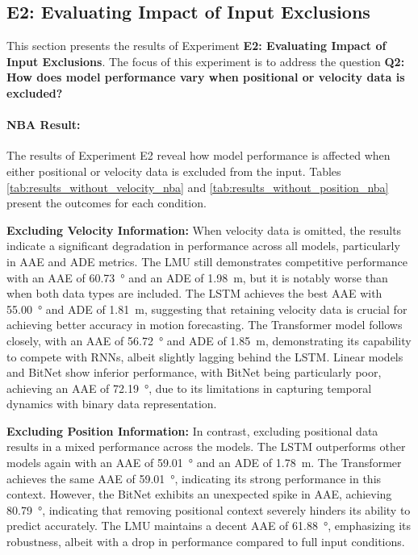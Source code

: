 \subsection{E2: Evaluating Impact of Input Exclusions}
\label{exp:pos_vel}
This section presents the results of Experiment \textbf{E2: Evaluating Impact of Input Exclusions}. The focus of this experiment is to address the question \textbf{Q2: How does model performance vary when positional or velocity data is excluded?}
\paragraph {NBA Result:}
The results of Experiment E2 reveal how model performance is affected when either positional or velocity data is excluded from the input. Tables \ref{tab:results_without_velocity_nba} and \ref{tab:results_without_position_nba} present the outcomes for each condition.

\textbf{Excluding Velocity Information:} When velocity data is omitted, the results indicate a significant degradation in performance across all models, particularly in AAE and ADE metrics. The LMU still demonstrates competitive performance with an AAE of \SI{60.73}{\degree} and an ADE of \SI{1.98}{\meter}, but it is notably worse than when both data types are included. The LSTM achieves the best AAE with \SI{55.00}{\degree} and ADE of \SI{1.81}{\meter}, suggesting that retaining velocity data is crucial for achieving better accuracy in motion forecasting. The Transformer model follows closely, with an AAE of \SI{56.72}{\degree} and ADE of \SI{1.85}{\meter}, demonstrating its capability to compete with RNNs, albeit slightly lagging behind the LSTM. Linear models and BitNet show inferior performance, with BitNet being particularly poor, achieving an AAE of \SI{72.19}{\degree}, due to its limitations in capturing temporal dynamics with binary data representation.

\textbf{Excluding Position Information:} In contrast, excluding positional data results in a mixed performance across the models. The LSTM outperforms other models again with an AAE of \SI{59.01}{\degree} and an ADE of \SI{1.78}{\meter}. The Transformer achieves the same AAE of \SI{59.01}{\degree}, indicating its strong performance in this context. However, the BitNet exhibits an unexpected spike in AAE, achieving \SI{80.79}{\degree}, indicating that removing positional context severely hinders its ability to predict accurately. The LMU maintains a decent AAE of \SI{61.88}{\degree}, emphasizing its robustness, albeit with a drop in performance compared to full input conditions.

